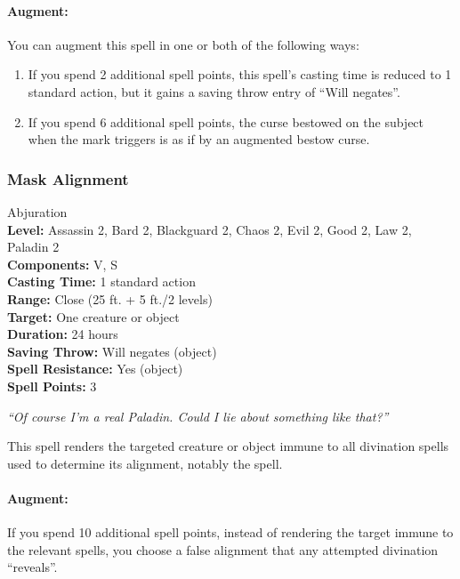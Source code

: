 \paragraph{Augment:} You can augment this spell in one or both of the following ways:
\begin{enumerate}
 \item If you spend 2 additional spell points, this spell's casting time is reduced to 1 standard action, 
 but it gains a saving throw entry of ``Will negates''.
 \item If you spend 6 additional spell points, the curse bestowed on the subject when the mark triggers is as if by an augmented bestow curse.
\end{enumerate}

\subsubsection{Mask Alignment}
\label{Spell:MaskAlignment}
Abjuration
\\ \textbf{Level:} Assassin 2, Bard 2, Blackguard 2, Chaos 2, Evil 2, Good 2, Law 2, Paladin 2
\\ \textbf{Components:} V, S
\\ \textbf{Casting Time:} 1 standard action
\\ \textbf{Range:} Close (25 ft. + 5 ft./2 levels)
\\ \textbf{Target:} One creature or object
\\ \textbf{Duration:} 24 hours
\\ \textbf{Saving Throw:} Will negates (object)
\\ \textbf{Spell Resistance:} Yes (object)
\\ \textbf{Spell Points:} 3

\emph{``Of course I'm a real Paladin. Could I lie about something like that?''}

This spell renders the targeted creature or object immune to all divination spells used to determine its alignment, notably the  spell.

\paragraph{Augment:} If you spend 10 additional spell points, instead of rendering the target immune to the relevant spells, you choose a false alignment that any attempted divination ``reveals''.
